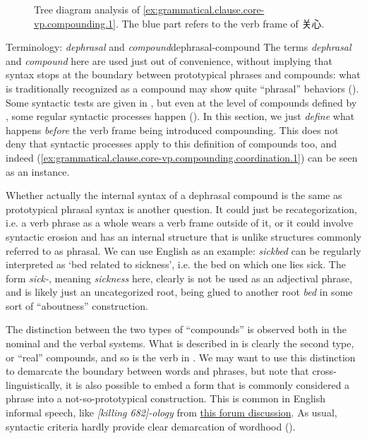 \documentclass[UTF8, a4paper, oneside, scheme=plain, 12pt]{ctexrep}
\newcommand*{\citepages}[1]{pp.~{#1}}
\newcommand*{\term}[1]{\emph{#1}}
\newcommand{\form}[1]{\emph{#1}}
\newcommand{\translate}[1]{`#1'}
\begin{document}
\begin{figure}[H]
    {
        \centering
        \small
        
    }
    \caption{Tree diagram analysis of \eqref{ex:grammatical.clause.core-vp.compounding.1}.
    The blue part refers to the verb frame of 关心.}
    \label{fig:grammatical.clause.core-vp.compounding.1}
\end{figure}

\begin{theorybox}{Terminology: \term{dephrasal} and \term{compound}}{dephrasal-compound}
    The terms \term{dephrasal} and \term{compound} here are used just out of convenience,
    without implying that syntax stops at the boundary between prototypical phrases and compounds:
    what is traditionally recognized as a compound may show quite ``phrasal'' behaviors 
    ().
    Some syntactic tests are given in \citet[\citepages{448-451}]{cgel},
    but even at the level of compounds defined by \citeauthor{cgel},
    some regular syntactic processes happen ().
    In this section, we just \emph{define} what happens \emph{before} the verb frame being introduced compounding.
    This does not deny that syntactic processes apply to this definition of compounds too,
    and indeed (\ref{ex:grammatical.clause.core-vp.compounding.coordination.1})
    can be seen as an instance.

    Whether actually the internal syntax of a dephrasal compound is the same as prototypical phrasal syntax is another question.
    It could just be recategorization, i.e. a verb phrase as a whole wears a verb frame outside of it,
    or it could involve syntactic erosion and has an internal structure that is unlike structures commonly referred to as phrasal.
    We can use English as an example:
    \form{sickbed} can be regularly interpreted as \translate{bed related to sickness}, 
    i.e. the bed on which one lies sick.
    The form \form{sick-}, meaning \form{sickness} here,
    clearly is not be used as an adjectival phrase,
    and is likely just an uncategorized root,
    being glued to another root \form{bed} in some sort of ``aboutness'' construction.

    The distinction between the two types of ``compounds'' is observed both in the nominal and the verbal systems.
    What is described in  is clearly the second type, or ``real'' compounds,
    and so is the verb in .
    We may want to use this distinction to demarcate the boundary between words and phrases,
    but note that cross-linguistically, it is also possible to embed a form that is commonly considered a phrase
    into a not-so-prototypical construction.
    This is common in English informal speech,
    like \form{[killing 682]-ology} from \href{https://scp-wiki.wikidot.com/forum/t-410418/scp-1066}{this forum discussion}.
    As usual, syntactic criteria hardly provide clear demarcation of wordhood
    ().
    

\end{theorybox}
\end{document}
